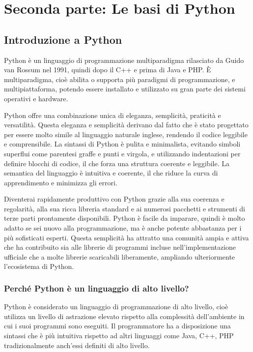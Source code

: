 \documentclass[
  letterpaper,
  DIV=11,
  numbers=noendperiod]{scrreprt}
\begin{document}
\part{Seconda parte: Le basi di Python}

\chapter{Introduzione a Python}\label{introduzione-a-python}

Python è un linguaggio di programmazione multiparadigma rilasciato da
Guido van Rossum nel 1991, quindi dopo il C++ e prima di Java e PHP. È
multiparadigma, cioè abilita o supporta più paradigmi di programmazione,
e multipiattaforma, potendo essere installato e utilizzato su gran parte
dei sistemi operativi e hardware.

Python offre una combinazione unica di eleganza, semplicità, praticità e
versatilità. Questa eleganza e semplicità derivano dal fatto che è stato
progettato per essere molto simile al linguaggio naturale inglese,
rendendo il codice leggibile e comprensibile. La sintassi di Python è
pulita e minimalista, evitando simboli superflui come parentesi graffe e
punti e virgola, e utilizzando indentazioni per definire blocchi di
codice, il che forza una struttura coerente e leggibile. La semantica
del linguaggio è intuitiva e coerente, il che riduce la curva di
apprendimento e minimizza gli errori.

Diventerai rapidamente produttivo con Python grazie alla sua coerenza e
regolarità, alla sua ricca libreria standard e ai numerosi pacchetti e
strumenti di terze parti prontamente disponibili. Python è facile da
imparare, quindi è molto adatto se sei nuovo alla programmazione, ma è
anche potente abbastanza per i più sofisticati esperti. Questa
semplicità ha attratto una comunità ampia e attiva che ha contribuito
sia alle librerie di programmi incluse nell'implementazione ufficiale
che a molte librerie scaricabili liberamente, ampliando ulteriormente
l'ecosistema di Python.

\section{Perché Python è un linguaggio di alto
livello?}\label{perchuxe9-python-uxe8-un-linguaggio-di-alto-livello}

Python è considerato un linguaggio di programmazione di alto livello,
cioè utilizza un livello di astrazione elevato rispetto alla complessità
dell'ambiente in cui i suoi programmi sono eseguiti. Il programmatore ha
a disposizione una sintassi che è più intuitiva rispetto ad altri
linguaggi come Java, C++, PHP tradizionalmente anch'essi definiti di
alto livello.
\end{document}
